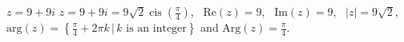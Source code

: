{ $z = 9 + 9i$ \label{polarcompbasicfirst}}
{ $z = 9 + 9i = 9\sqrt{2}\operatorname{cis}\left(\frac{\pi}{4}\right)$, \, $\text{Re}(z) = 9$, \, $\text{Im}(z) = 9$, \, $|z| = 9\sqrt{2}$, \,  $\text{arg}(z) = \left\{\frac{\pi}{4} + 2\pi k \, | \, \text{$k$ is an integer} \right\}$ and $\text{Arg}(z) = \frac{\pi}{4}$.}
